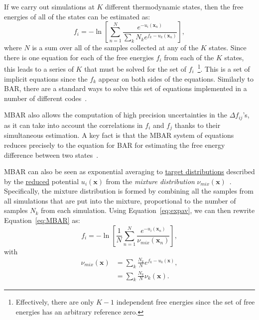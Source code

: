 \documentclass[9pt,review]{livecoms}
\newcommand{\vx}{\mathbf{x}}
\begin{document}
If we carry out simulations at $K$ different thermodynamic states,
then the free energies of all of the states can be estimated as:
\begin{equation}
f_i = -\ln \left[\sum_{n=1}^N \frac{e^{-u_i(\vx_n)}}{\sum_k N_k e^{f_k-u_k(\vx_n)}}\right],
\label{eq:MBAR}
\end{equation}
where $N$ is a sum over all of the samples collected at any of the $K$ states.
Since there is one equation for each of the free energies $f_i$ from each of the $K$ states, this leads to a series of $K$ that must be solved for the set of $f_i$~\footnote{Effectively, there are only $K-1$ independent free energies since the set of free energies has an arbitrary reference zero.}. This is a set of implicit equations since the $f_k$ appear on both sides of the equations. Similarly to BAR, there are a standard ways to solve this set of equations implemented in a number of different codes~\cite{shirts-chodera:jcp:2008:mbar,tan_binless_2012,Zhang:JPCL:2015}.

MBAR also allows the computation of high precision uncertainties in the $\Delta
f_{ij}$'s, as it can take into account the correlations in $f_i$ and
$f_j$ thanks to their simultaneous estimation.  A key fact is that the MBAR system of equations reduces precisely to the equation for BAR for estimating the free energy difference between two states~\cite{shirts-chodera:jcp:2008:mbar}.

MBAR can also be seen as exponential averaging to \hyperlink{ref:targetdist} {target distributions} described by the \hyperlink{ref:reduced} {reduced} potential $u_i(\vx)$ from the \emph{mixture distribution} $\nu_{mix}(\vx)$~\cite{reweighting_mixture_distribution}. Specifically, the mixture distribution is formed by combining all the samples from all simulations that are put into the mixture, proportional to the number of samples $N_k$ from each simulation.  Using Equation~\ref{eq:expav}, we can then rewrite Equation~\ref{eq:MBAR} as:
\begin{equation}
f_i = -\ln \left[\frac{1}{N}\sum_{n=1}^N \frac{e^{-u_i(\vx_n)}}{\nu_{mix}(\vx_n)}\right],
\end{equation}
with
\begin{align}
\nu_{mix}(\vx) &= \sum_k \frac{N_k}{N} e^{f_k-u_k(\vx)},
\nonumber \\
&= \sum_k \frac{N_k}{N} \nu_k(\vx).
\end{align}
\end{document}
